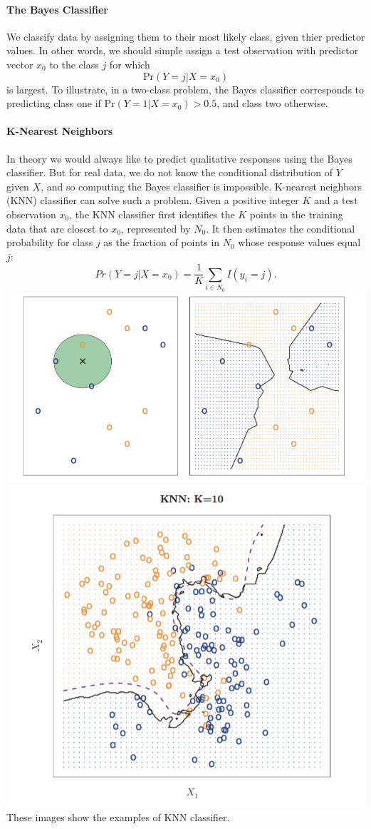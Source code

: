 \documentclass{article}
\begin{document}
\paragraph{The Bayes Classifier}
We classify data by assigning them to their most likely class, given thier predictor values. In other words, we should simple assign a test observation with predictor vector $x_0$ to the class $j$ for which
\[
	\text{Pr}(Y = j | X = x_0)
\]
is largest. To illustrate, in a two-class problem, the Bayes classifier corresponds to predicting class one if $\text{Pr}(Y = 1 | X = x_0) > 0.5$, and class two otherwise.

\paragraph{K-Nearest Neighbors}
In theory we would always like to predict qualitative responses using the Bayes classifier. But for real data, we do not know the conditional distribution of $Y$ given $X$, and so computing the Bayes classifier is impossible. K-nearest neighbors (KNN) classifier can solve such a problem. Given a positive integer $K$ and a test observation $x_0$, the KNN classifier first identifies the $K$ points in the training data that are closest to $x_0$, represented by $N_0$. It then estimates the conditional probability for class $j$ as the fraction of points in $N_0$ whose response values equal $j$:
\[
	Pr(Y = j | X = x_0) = \frac{1}{K}\sum_{i\in N_0}I(y_i = j).
\]
\includegraphics[scale=0.8]{images/knn1.png} \\ 

\includegraphics[scale=0.8]{images/knn2.png} \\ 
These images show the examples of KNN classifier.
\end{document}
